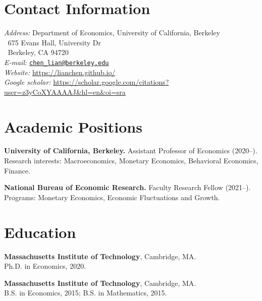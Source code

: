 \documentclass[line]{res}
\newenvironment{list1}{
  \begin{list}{\ding{113}}{%
      \setlength{\itemsep}{0.07in}
      \setlength{\parsep}{0in} \setlength{\parskip}{0in}
		\setlength{\topsep}{0.07in} \setlength{\partopsep}{0in}
      \setlength{\leftmargin}{0.0in}}}{\end{list}}
\begin{document}
\renewcommand{\sc}{}

\begin{resume}
\section{\sc Contact Information}
\vspace{.05in}
{\it Address:} 
Department of Economics, University of California, Berkeley\\
$~$ \hspace{12mm}
675 Evans Hall, University Dr \\
$~$ \hspace{12mm} 
Berkeley, CA 94720
$~$ \hspace{12mm} \\
  {\it E-mail:} \href{mailto:chen_lian@berkeley.edu}{\nolinkurl{chen_lian@berkeley.edu}} \\
  {\it Website:} \url{https://lianchen.github.io/} \\
  {\it Google scholar:} \url{https://scholar.google.com/citations?user=z3yCoXYAAAAJ&hl=en&oi=sra} 


\section{\sc Academic Positions}

\begin{list1}

\item[] 
\textbf{University of California, Berkeley.} Assistant Professor of Economics (2020--).\\
 Research interests: Macroeconomics, Monetary Economics, Behavioral Economics, Finance.
\vspace{0.2cm}
\item[]
\textbf{National Bureau of Economic Research.} Faculty Research Fellow (2021--). \\
 Programs: Monetary Economics, Economic Fluctuations and Growth.
\end{list1}
\section{\sc Education} 

\begin{list1}
\item[]
\textbf{Massachusetts Institute of Technology}, Cambridge, MA. \\
Ph.D. in Economics, 2020.
\vspace{0.2cm}
\item[]
\textbf{Massachusetts Institute of Technology}, Cambridge, MA.\\
B.S. in Economics, 2015; B.S. in Mathematics, 2015. 
\end{list1}


\end{resume}
\end{document}
